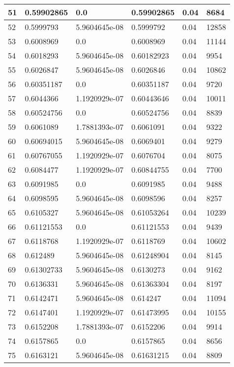 \begin{longtable}{|l|l|l|l|l|l|}
51 & 0.59902865 & 0.0 & 0.59902865 & 0.04 & 8684 \\ \hline 
52 & 0.5999793 & 5.9604645e-08 & 0.5999792 & 0.04 & 12858 \\ \hline 
53 & 0.6008969 & 0.0 & 0.6008969 & 0.04 & 11144 \\ \hline 
54 & 0.6018293 & 5.9604645e-08 & 0.60182923 & 0.04 & 9954 \\ \hline 
55 & 0.6026847 & 5.9604645e-08 & 0.6026846 & 0.04 & 10862 \\ \hline 
56 & 0.60351187 & 0.0 & 0.60351187 & 0.04 & 9720 \\ \hline 
57 & 0.6044366 & 1.1920929e-07 & 0.60443646 & 0.04 & 10011 \\ \hline 
58 & 0.60524756 & 0.0 & 0.60524756 & 0.04 & 8839 \\ \hline 
59 & 0.6061089 & 1.7881393e-07 & 0.6061091 & 0.04 & 9322 \\ \hline 
60 & 0.60694015 & 5.9604645e-08 & 0.6069401 & 0.04 & 9279 \\ \hline 
61 & 0.60767055 & 1.1920929e-07 & 0.6076704 & 0.04 & 8075 \\ \hline 
62 & 0.6084477 & 1.1920929e-07 & 0.60844755 & 0.04 & 7700 \\ \hline 
63 & 0.6091985 & 0.0 & 0.6091985 & 0.04 & 9488 \\ \hline 
64 & 0.6098595 & 5.9604645e-08 & 0.6098596 & 0.04 & 8257 \\ \hline 
65 & 0.6105327 & 5.9604645e-08 & 0.61053264 & 0.04 & 10239 \\ \hline 
66 & 0.61121553 & 0.0 & 0.61121553 & 0.04 & 9439 \\ \hline 
67 & 0.6118768 & 1.1920929e-07 & 0.6118769 & 0.04 & 10602 \\ \hline 
68 & 0.612489 & 5.9604645e-08 & 0.61248904 & 0.04 & 8145 \\ \hline 
69 & 0.61302733 & 5.9604645e-08 & 0.6130273 & 0.04 & 9162 \\ \hline 
70 & 0.6136331 & 5.9604645e-08 & 0.61363304 & 0.04 & 8197 \\ \hline 
71 & 0.6142471 & 5.9604645e-08 & 0.614247 & 0.04 & 11094 \\ \hline 
72 & 0.6147401 & 1.1920929e-07 & 0.61473995 & 0.04 & 10155 \\ \hline 
73 & 0.6152208 & 1.7881393e-07 & 0.6152206 & 0.04 & 9914 \\ \hline 
74 & 0.6157865 & 0.0 & 0.6157865 & 0.04 & 8656 \\ \hline 
75 & 0.6163121 & 5.9604645e-08 & 0.61631215 & 0.04 & 8809 \\ \hline 
\end{longtable}